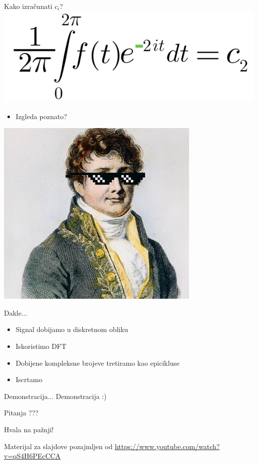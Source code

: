\documentclass{beamer}
\begin{document}
\begin{frame}{Kako izra\v{c}unati $c_i$?}
    \centering
    \includegraphics[scale=0.3]{images/ep14.PNG}
    \begin{itemize}
        \item Izgleda poznato?
    \end{itemize}
    \includegraphics[scale=0.3]{images/fourier.PNG}
\end{frame}

\begin{frame}{Dakle...}
    \begin{itemize}
        \item Signal dobijamo u diskretnom obliku
        \item Iskoristimo DFT
        \item Dobijene kompleksne brojeve tretiramo kao epicikluse
        \item Iscrtamo 
    \end{itemize}
\end{frame}

\begin{frame}{Demonstracija...}
    \centering
    Demonstracija :)
\end{frame}

\begin{frame}{Pitanja}
    \centering
    ???
\end{frame}

\begin{frame}{}
    \centering
    Hvala na pa\v{z}nji!
\end{frame}

\begin{frame}{Materijal za slajdove pozajmljen od}
    \centering
    \url{https://www.youtube.com/watch?v=qS4H6PEcCCA}
\end{frame}
\end{document}
